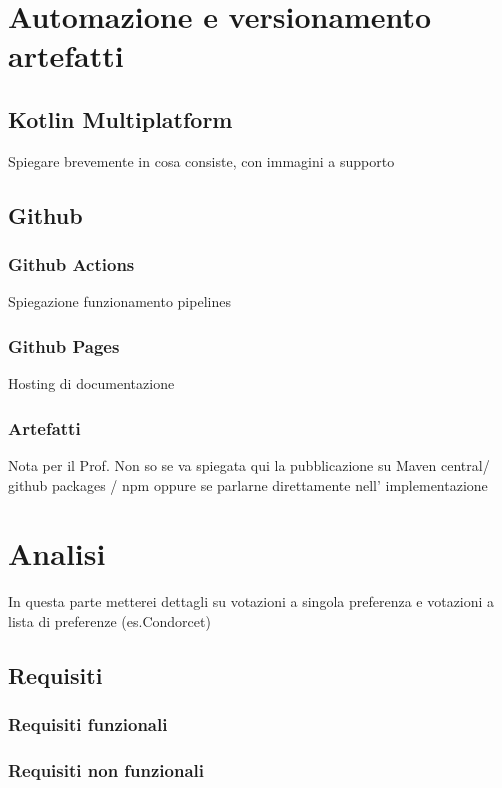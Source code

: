 \documentclass[12pt,a4paper,openright,twoside]{book}
\begin{document}
\chapter{Automazione e versionamento artefatti}

\section{Kotlin Multiplatform}
Spiegare brevemente in cosa consiste, con immagini a supporto

\section{Github}

    \subsection{Github Actions}
    Spiegazione funzionamento pipelines

    \subsection{Github Pages}
    Hosting di documentazione

    \subsection{Artefatti}
    Nota per il Prof.
    Non so se va spiegata qui la pubblicazione su Maven central/ github packages / npm
    oppure se parlarne direttamente nell' implementazione
\chapter{Analisi}
In questa parte metterei dettagli su votazioni a singola preferenza 
e votazioni a lista di preferenze (es.Condorcet)
\section{Requisiti}

    \subsection{Requisiti funzionali}

    \subsection{Requisiti non funzionali}
\end{document}

